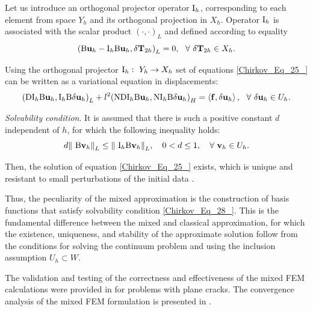Let us introduce an orthogonal projector operator ${{\rm I}}_h$, corresponding to each element from space $Y_h$ and its orthogonal projection in $X_h$. Operator ${{\rm I}}_h$ is associated with the scalar product ${\left(\cdot ,\cdot \right)}_L$ and defined according to equality
\begin{equation} \label{Chirkov_Eq_26_} 
	{\left({\rm B}{{\mathbf u}}_h-{{\rm I}}_h{\rm B}{{\mathbf u}}_h,\delta {{\mathbf T}}_{2h}\right)}_L=0,\ \ \forall \ \delta {{\mathbf T}}_{2h}\in X_h. 
\end{equation} 

Using the orthogonal projector ${{\rm I}}_h:\ Y_h\to X_h$ set of equations \eqref{Chirkov_Eq_25_} can be written as a variational equation in displacements:
\begin{equation} \label{Chirkov_Eq_27_} 
	{\left({\rm D}{{\rm I}}_h{\rm B}{{\mathbf u}}_h,{{\rm I}}_h{\rm B}\delta {{\mathbf u}}_h\right)}_L+l^2{\left({\rm ND}{{\rm I}}_h{\rm B}{{\mathbf u}}_h,{\rm N}{{\rm I}}_h{\rm B}{\delta {\mathbf u}}_h\right)}_H=\left\langle {\mathbf f},{\delta {\mathbf u}}_h\right\rangle ,\ \ \forall {\ \delta {\mathbf u}}_h\in U_h. 
\end{equation} 

\medskip
\emph{Solvability condition}. It is assumed that there is such a positive constant $d$ independent of $h$, for which the following inequality holds:
\begin{equation} \label{Chirkov_Eq_28_} 
	d{\|\ {\rm B}{{\mathbf v}}_h\|}_L\le {\|\ {{\rm I}}_h{\rm B}{{\mathbf v}}_h\|}_L,\quad 0<d\le 1,\quad \forall \ {{\mathbf v}}_h\in U_h.                   
\end{equation} 

Then, the solution of equation \eqref{Chirkov_Eq_25_} exists, which is unique and resistant to small perturbations of the initial data \cite{Chirkov38, Chirkov39}. 

Thus, the peculiarity of the mixed approximation is the construction of basis functions that satisfy solvability condition \eqref{Chirkov_Eq_28_}. This is the fundamental difference between the mixed and classical approximation, for which the existence, uniqueness, and stability of the approximate solution follow from the conditions for solving the continuum problem and using the inclusion assumption $U_h\subset W$.

The validation and testing of the correctness and effectiveness of the mixed FEM calculations were provided in \cite{Chirkov38, Chirkov40, Chirkov41} for problems with plane cracks. The convergence analysis of the mixed FEM formulation is presented in \cite{Chirkov43}.


